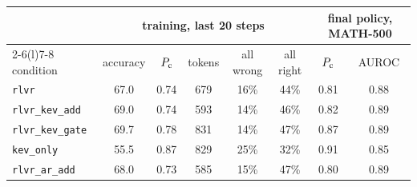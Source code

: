 \begin{tabular}{@{}lccccccc@{}}
\toprule
 & \multicolumn{5}{c}{training, last 20 steps} & \multicolumn{2}{c}{final policy, MATH-500} \\ \cmidrule(lr){2-6}\cmidrule(l){7-8}
condition & accuracy & \kev{} $P_{\mathrm{c}}$ & tokens & all wrong & all right & \kev{} $P_{\mathrm{c}}$ & \kev{} AUROC \\ \midrule
\texttt{rlvr} & 67.0 & 0.74 & 679 & 16\% & 44\% & 0.81 & 0.88 \\
\texttt{rlvr\_kev\_add} & 69.0 & 0.74 & 593 & 14\% & 46\% & 0.82 & 0.89 \\
\texttt{rlvr\_kev\_gate} & 69.7 & 0.78 & 831 & 14\% & 47\% & 0.87 & 0.89 \\
\texttt{kev\_only} & 55.5 & 0.87 & 829 & 25\% & 32\% & 0.91 & 0.85 \\
\texttt{rlvr\_ar\_add} & 68.0 & 0.73 & 585 & 15\% & 47\% & 0.80 & 0.89 \\
\bottomrule
\end{tabular}
